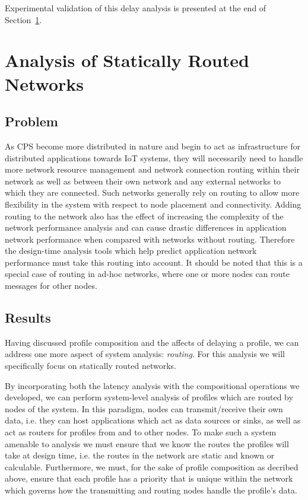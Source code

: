 Experimental validation of this delay analysis is presented at the end
of Section~\ref{sec:routing}.

\newpage

\section{Analysis of Statically Routed Networks}
\label{sec:routing}

\subsection{Problem}
As CPS become more distributed in nature and begin to act as
infrastructure for distributed applications towards IoT systems, they
will necessarily need to handle more network resource management and
network connection routing within their network as well as between
their own network and any external networks to which they are
connected.  Such networks generally rely on routing to allow more
flexibility in the system with respect to node placement and
connectivity.  Adding routing to the network also has the effect of
increasing the complexity of the network performance analysis and can
cause drastic differences in application network performance when
compared with networks without routing.  Therefore the design-time
analysis tools which help predict application network performance must
take this routing into account.  It should be noted that this is a
special case of routing in ad-hoc networks, where one or more nodes
can route messages for other nodes.

\subsection{Results}
Having discussed profile composition and the affects of delaying a
profile, we can address one more aspect of system analysis:
\emph{routing}.  For this analysis we will specifically focus on
statically routed networks.

By incorporating both the latency analysis with the compositional
operations we developed, we can perform system-level analysis of profiles
which are routed by nodes of the system.  In this paradigm, nodes can
transmit/receive their own data, i.e. they can host applications which
act as data sources or sinks, as well as act as routers for profiles from
and to other nodes.  To make such a system amenable to analysis we
must ensure that we know the routes the profiles will take at design
time, i.e. the routes in the network are static and known or
calculable.  Furthermore, we must, for the sake of profile composition as
decribed above, ensure that each profile has a priority that is unique
within the network which governs how the transmitting and routing
nodes handle the profile's data.


